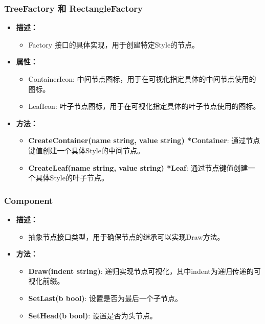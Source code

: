 \documentclass[hyperref,a4paper,UTF8]{ctexart}
\begin{document}
\subsubsection{TreeFactory 和 RectangleFactory}
\begin{itemize}
    \item \textbf{描述：}
    \begin{itemize}
        \item Factory 接口的具体实现，用于创建特定Style的节点。
    \end{itemize}
    \item \textbf{属性：}
    \begin{itemize}
        \item ContainerIcon: 中间节点图标，用于在可视化指定具体的中间节点使用的图标。
        \item LeafIcon: 叶子节点图标，用于在可视化指定具体的叶子节点使用的图标。
    \end{itemize}
    \item \textbf{方法：}
    \begin{itemize}
        \item \textbf{CreateContainer(name string, value string) *Container}: 通过节点键值创建一个具体Style的中间节点。
        \item \textbf{CreateLeaf(name string, value string) *Leaf}: 通过节点键值创建一个具体Style的叶子节点。
    \end{itemize}
\end{itemize}

\subsubsection{Component}
\begin{itemize}
    \item \textbf{描述：}
    \begin{itemize}
        \item 抽象节点接口类型，用于确保节点的继承可以实现Draw方法。
    \end{itemize}
    \item \textbf{方法：}
    \begin{itemize}
        \item \textbf{Draw(indent string)}: 递归实现节点可视化，其中indent为递归传递的可视化前缀。
        \item \textbf{SetLast(b bool)}: 设置是否为最后一个子节点。
        \item \textbf{SetHead(b bool)}: 设置是否为头节点。
    \end{itemize}
\end{itemize}
\end{document}
